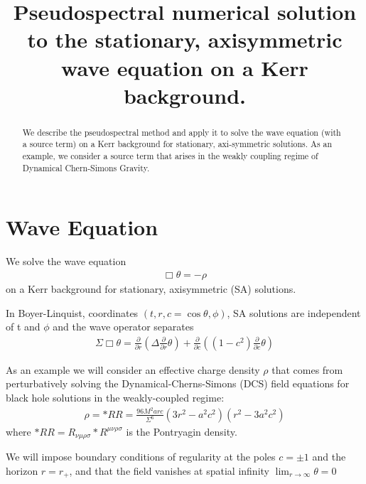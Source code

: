 \documentclass[aps,prd,amsmath,showpacs,amssymb,superscriptaddress,nofootinbib,longbibliography,eqsecnum,preprintnumbers]{revtex4-1}
\newcommand{\Caltech}{\affiliation{Theoretical Astrophysics 350-17, California Institute of Technology, Pasadena, CA 91125}}
\begin{document}
\title{Pseudospectral numerical solution to the stationary, axisymmetric wave equation on a Kerr background.}
\begin{abstract}
We describe the pseudospectral method  and apply it to solve the wave equation (with a source term) on a Kerr background for stationary, axi-symmetric solutions. As an example, we consider a source term that arises in the weakly coupling regime of Dynamical Chern-Simons Gravity.
\end{abstract}
\maketitle
\tableofcontents

\section{Wave Equation}
We solve the wave equation 
\begin{align}
\Box \theta =-\rho \label{eq:wave}
\end{align}
on a Kerr background for stationary, axisymmetric (SA) solutions. 

In Boyer-Linquist, coordinates $(t,r,c=\cos\theta,\phi)$, SA solutions are independent of t and $\phi$ and the wave operator separates
\begin{align}
\Sigma \Box \theta= \frac{\partial}{\partial r}\left(\Delta \frac{\partial }{\partial r}\theta\right) + \frac{\partial}{\partial c}\left((1-c^2) \frac{\partial }{\partial c}\theta\right)
\end{align}

As an example we will consider an effective charge density $\rho$ that comes from perturbatively solving the Dynamical-Cherns-Simons (DCS) field equations for black hole solutions in the weakly-coupled regime:
\begin{align}
\rho=*RR =\frac{96M^2arc}{\Sigma^6}(3r^2-a^2c^2)(r^2-3a^2c^2)
\end{align}
where $*RR=R_{\nu \mu\rho\sigma}*R^{\mu\nu\rho\sigma}$ is the Pontryagin density.

We will impose boundary conditions of regularity at the poles $c=\pm 1$ and the horizon $r=r_+$, and that the field vanishes at spatial infinity $\lim_{r\to \infty}\theta= 0$
\end{document}
